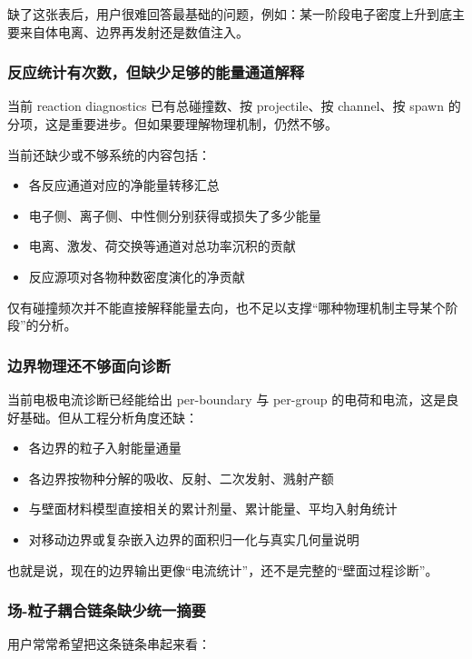 \documentclass[11pt,a4paper]{ctexart}
\begin{document}
缺了这张表后，用户很难回答最基础的问题，例如：某一阶段电子密度上升到底主要来自体电离、边界再发射还是数值注入。

\subsubsection{反应统计有次数，但缺少足够的能量通道解释}

当前 reaction diagnostics 已有总碰撞数、按 projectile、按 channel、按 spawn 的分项，这是重要进步。但如果要理解物理机制，仍然不够。

当前还缺少或不够系统的内容包括：

\begin{itemize}
  \item 各反应通道对应的净能量转移汇总
  \item 电子侧、离子侧、中性侧分别获得或损失了多少能量
  \item 电离、激发、荷交换等通道对总功率沉积的贡献
  \item 反应源项对各物种数密度演化的净贡献
\end{itemize}

仅有碰撞频次并不能直接解释能量去向，也不足以支撑“哪种物理机制主导某个阶段”的分析。

\subsubsection{边界物理还不够面向诊断}

当前电极电流诊断已经能给出 per-boundary 与 per-group 的电荷和电流，这是良好基础。但从工程分析角度还缺：

\begin{itemize}
  \item 各边界的粒子入射能量通量
  \item 各边界按物种分解的吸收、反射、二次发射、溅射产额
  \item 与壁面材料模型直接相关的累计剂量、累计能量、平均入射角统计
  \item 对移动边界或复杂嵌入边界的面积归一化与真实几何量说明
\end{itemize}

也就是说，现在的边界输出更像“电流统计”，还不是完整的“壁面过程诊断”。

\subsubsection{场-粒子耦合链条缺少统一摘要}

用户常常希望把这条链条串起来看：
\end{document}
